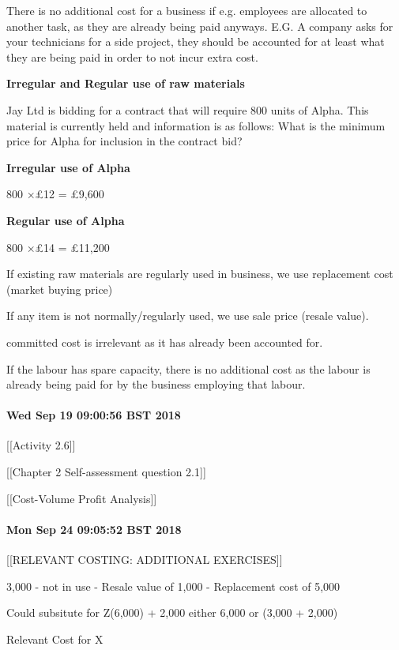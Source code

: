 \documentclass{article}
\begin{document}
There is no additional cost for a business if e.g. employees are allocated to another task, as they are already being paid anyways.
E.G. A company asks for your technicians for a side project, they should be accounted for at least what they are being paid in order to not incur extra cost.

\textbf{Irregular and Regular use of raw materials}


Jay Ltd is bidding for a contract that will require 800 units of Alpha.
This material is currently held and information is as follows:
What is the minimum price for Alpha for inclusion in the contract bid?

\textbf{Irregular use of Alpha}


800 ×£12 = £9,600


\textbf{Regular use of Alpha}


800 ×£14 = £11,200


If existing raw materials are regularly used in business, we use replacement cost (market buying price) 


If any item is not normally/regularly used, we use sale price (resale value).


committed cost is irrelevant as it has already been accounted for.


If the labour has spare capacity, there is no additional cost as the labour is already being paid for by the business employing that labour.


\paragraph{Wed Sep 19 09:00:56 BST 2018}


[[Activity 2.6]]

[[Chapter 2 Self-assessment question 2.1]]


[[Cost-Volume Profit Analysis]]


\clearpage

\paragraph{Mon Sep 24 09:05:52 BST 2018}


[[RELEVANT COSTING: ADDITIONAL EXERCISES]]


3,000 - not in use - Resale value of 1,000 - Replacement cost of 5,000

Could subsitute for Z(6,000) + 2,000 
either 6,000 or (3,000 + 2,000)

Relevant Cost for X 
\end{document}
